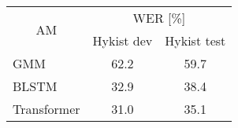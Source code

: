 \begin{table}[!ht]
\captionsetup{font=Large}
\centering
\begin{adjustbox}{width=0.5\columnwidth,center}
\begin{tabular}{|l|c|c|} 
\hline
\multicolumn{1}{|c|}{\multirow{2}{*}{AM}} & \multicolumn{2}{c|}{WER [\%]}  \\ 
\cline{2-3}
\multicolumn{1}{|c|}{}                    & Hykist dev & Hykist test       \\ 
\hline
GMM                                       & 62.2       & 59.7              \\ 
\hline
BLSTM                                     & 32.9       & 38.4              \\ 
\hline
Transformer                               & 31.0       & 35.1              \\
\hline
\end{tabular}
\end{adjustbox}
\caption{}
\label{table:supervised_baselines}
\end{table}



